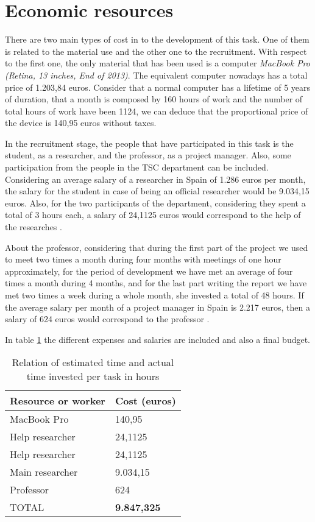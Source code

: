 \section{Economic resources}
	
	There are two main types of cost in to the development of this task. One of them is related to the material use and the other one to the recruitment. With respect to the first one, the only material that has been used is a computer \textit{MacBook Pro (Retina, 13 inches, End of 2013)}. The equivalent computer nowadays has a total price of 1.203,84 euros. Consider that a normal computer has a lifetime of 5 years of duration, that a month is composed by 160 hours of work and the number of total hours of work have been 1124, we can deduce that the proportional price of the device is 140,95 euros without taxes.
	
	In the recruitment stage, the people that have participated in this task is the student, as a researcher, and the professor, as a project manager. Also, some participation from the people in the TSC department can be included. Considering an average salary of a researcher in Spain of 1.286 euros per month, the salary for the student in case of being an official researcher would be 9.034,15 euros. Also, for the two participants of the department, considering they spent a total of 3 hours each, a salary of 24,1125 euros would correspond to the help of the researches \cite{Indeed2020}. 
	
	About the professor, considering that during the first part of the project we used to meet two times a month during four months with meetings of one hour approximately, for the period of development we have met an average of four times a month during 4 months, and for the last part writing the report we have met two times a week during a whole month, she invested a total of 48 hours. If the average salary per month of a project manager in Spain is 2.217 euros, then a salary of 624 euros would correspond to the professor \cite{Indeed2020a}.
	
	In table \ref{table:15} the different expenses and salaries are included and also a final budget.
	
		\begin{table}[H]
		\begin{center}
			\begin{tabular}{|| m{10em} | m{7em} ||}
				\hline
				\textbf{Resource or worker} & \textbf{Cost (euros)} \\
				\hline\hline
				MacBook Pro & 140,95  \\
				\hline
				Help researcher & 24,1125 \\
				\hline
				Help researcher & 24,1125 \\
				\hline
				Main researcher & 9.034,15 \\
				\hline
				Professor & 624 \\
				\hline
				TOTAL & \textbf{9.847,325} \\
				\hline
			\end{tabular}
		\end{center}
		\caption{Relation of estimated time and actual time invested  per task in hours}
		\label{table:15}
	\end{table}
	

